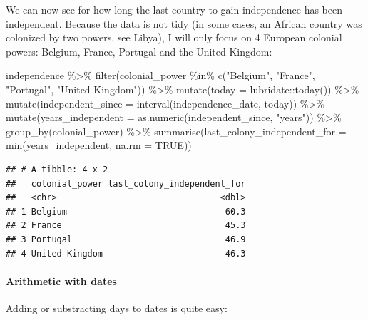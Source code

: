 \documentclass[
]{article}
\newenvironment{Shaded}{\begin{snugshade}}{\end{snugshade}}
\newcommand{\AttributeTok}[1]{\textcolor[rgb]{0.77,0.63,0.00}{#1}}
\newcommand{\ConstantTok}[1]{\textcolor[rgb]{0.00,0.00,0.00}{#1}}
\newcommand{\FunctionTok}[1]{\textcolor[rgb]{0.00,0.00,0.00}{#1}}
\newcommand{\NormalTok}[1]{#1}
\newcommand{\SpecialCharTok}[1]{\textcolor[rgb]{0.00,0.00,0.00}{#1}}
\newcommand{\StringTok}[1]{\textcolor[rgb]{0.31,0.60,0.02}{#1}}
\begin{document}
We can now see for how long the last country to gain independence has been independent.
Because the data is not tidy (in some cases, an African country was colonized by two powers,
see Libya), I will only focus on 4 European colonial powers: Belgium, France, Portugal and the United Kingdom:

\begin{Shaded}
\begin{Highlighting}[]
\NormalTok{independence }\SpecialCharTok{\%\textgreater{}\%}
  \FunctionTok{filter}\NormalTok{(colonial\_power }\SpecialCharTok{\%in\%} \FunctionTok{c}\NormalTok{(}\StringTok{"Belgium"}\NormalTok{, }\StringTok{"France"}\NormalTok{, }\StringTok{"Portugal"}\NormalTok{, }\StringTok{"United Kingdom"}\NormalTok{)) }\SpecialCharTok{\%\textgreater{}\%}
  \FunctionTok{mutate}\NormalTok{(}\AttributeTok{today =}\NormalTok{ lubridate}\SpecialCharTok{::}\FunctionTok{today}\NormalTok{()) }\SpecialCharTok{\%\textgreater{}\%}
  \FunctionTok{mutate}\NormalTok{(}\AttributeTok{independent\_since =} \FunctionTok{interval}\NormalTok{(independence\_date, today)) }\SpecialCharTok{\%\textgreater{}\%}
  \FunctionTok{mutate}\NormalTok{(}\AttributeTok{years\_independent =} \FunctionTok{as.numeric}\NormalTok{(independent\_since, }\StringTok{"years"}\NormalTok{)) }\SpecialCharTok{\%\textgreater{}\%}
  \FunctionTok{group\_by}\NormalTok{(colonial\_power) }\SpecialCharTok{\%\textgreater{}\%}
  \FunctionTok{summarise}\NormalTok{(}\AttributeTok{last\_colony\_independent\_for =} \FunctionTok{min}\NormalTok{(years\_independent, }\AttributeTok{na.rm =} \ConstantTok{TRUE}\NormalTok{))}
\end{Highlighting}
\end{Shaded}

\begin{verbatim}
## # A tibble: 4 x 2
##   colonial_power last_colony_independent_for
##   <chr>                                <dbl>
## 1 Belgium                               60.3
## 2 France                                45.3
## 3 Portugal                              46.9
## 4 United Kingdom                        46.3
\end{verbatim}

\hypertarget{arithmetic-with-dates}{%
\paragraph{Arithmetic with dates}\label{arithmetic-with-dates}}

Adding or substracting days to dates is quite easy:
\end{document}
